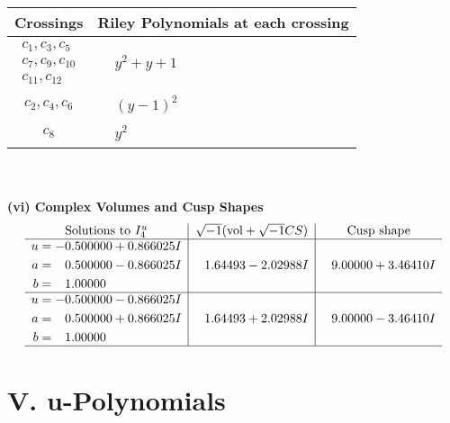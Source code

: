 \documentclass[1p]{elsarticle_modified}
\theoremstyle{definition}
\newcommand{\I}{\sqrt{-1}}
\begin{document}
\begin{tabular}{m{50pt}|m{274pt}}
Crossings & \hspace{64pt}Riley Polynomials at each crossing \\
\hline $$\begin{aligned}c_{1},c_{3},c_{5}\\c_{7},c_{9},c_{10}\\c_{11},c_{12}\end{aligned}$$&$\begin{aligned}
&y^2+y+1
\end{aligned}$\\
\hline $$\begin{aligned}c_{2},c_{4},c_{6}\end{aligned}$$&$\begin{aligned}
&(y-1)^2
\end{aligned}$\\
\hline $$\begin{aligned}c_{8}\end{aligned}$$&$\begin{aligned}
&y^2
\end{aligned}$\\
\hline
\end{tabular}\\~\\
\newpage\flushleft \textbf{(vi) Complex Volumes and Cusp Shapes}
$$\begin{array}{c|c|c}  
\text{Solutions to }I^u_{4}& \I (\text{vol} + \sqrt{-1}CS) & \text{Cusp shape}\\
 \hline 
\begin{aligned}
u &= -0.500000 + 0.866025 I \\
a &= \phantom{-}0.500000 - 0.866025 I \\
b &= \phantom{-}1.00000\phantom{ +0.000000I}\end{aligned}
 & \phantom{-}1.64493 - 2.02988 I & \phantom{-}9.00000 + 3.46410 I \\ \hline\begin{aligned}
u &= -0.500000 - 0.866025 I \\
a &= \phantom{-}0.500000 + 0.866025 I \\
b &= \phantom{-}1.00000\phantom{ +0.000000I}\end{aligned}
 & \phantom{-}1.64493 + 2.02988 I & \phantom{-}9.00000 - 3.46410 I\\
 \hline 
 \end{array}$$\newpage
\newpage\renewcommand{\arraystretch}{1}
\centering \section*{ V. u-Polynomials}
\end{document}
